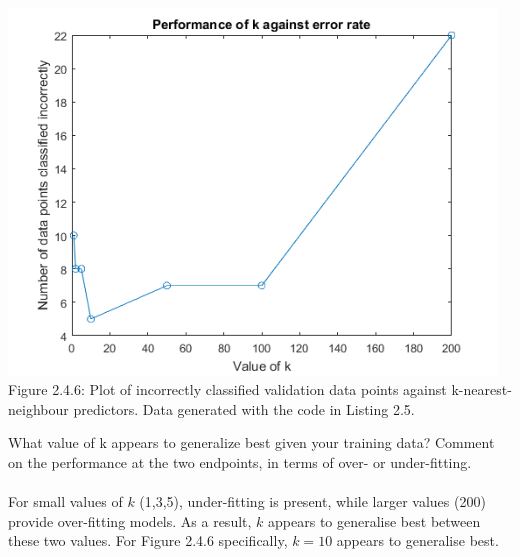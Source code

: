 \documentclass[]{report}   %
\begin{document}
\begin{center}
	\includegraphics[width=35em]{2_4_Figure_6.png}
	{Figure 2.4.6: Plot of incorrectly classified validation data points against k-nearest-neighbour predictors. Data generated with the code in Listing 2.5.}
\end{center} 
{What value of k appears to generalize best given your training data? Comment on the performance at the two endpoints, in terms of over- or under-fitting.} \\~\\
{For small values of $k$ (1,3,5), under-fitting is present, while larger values (200) provide over-fitting models. As a result, $k$ appears to generalise best between these two values. For Figure 2.4.6 specifically, $k = 10$ appears to generalise best.}
\end{document}

